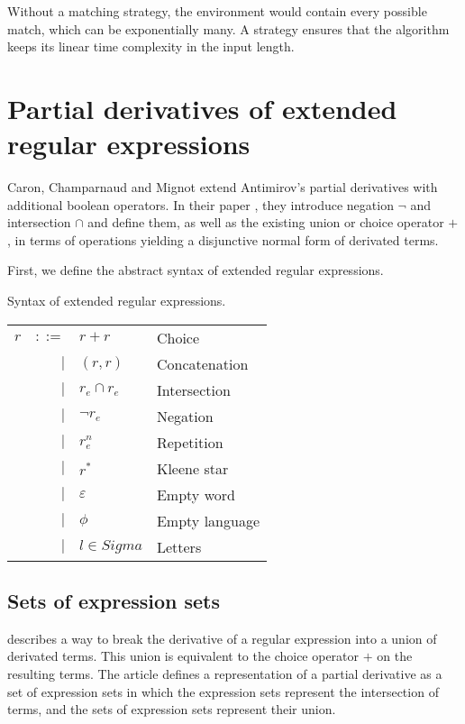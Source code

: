 Without a matching strategy, the environment would contain every possible match,
which can be exponentially many. A strategy ensures that the algorithm keeps its
linear time complexity in the input length.


\section{Partial derivatives of extended regular expressions}

Caron, Champarnaud and Mignot extend Antimirov's partial derivatives with
additional boolean operators. In their paper \cite{pdere}, they introduce
negation $\neg$ and intersection $\cap$ and define them, as well as the existing
union or choice operator $+$, in terms of operations yielding a disjunctive
normal form of derivated terms.

First, we define the abstract syntax of extended regular expressions.

\begin{defn}
   \label{defn-ere-syn}
   Syntax of extended regular expressions.

   \begin{tabular}{lrll}
      $r$	& $::=$	& $r+r$				& Choice		\\
		& $|$	& $(r,r)$			& Concatenation		\\
		& $|$	& $r_e \cap r_e$		& Intersection		\\
        	& $|$	& $\neg r_e$			& Negation		\\
        	& $|$	& $r_e^n$			& Repetition		\\
		& $|$	& $r^*$				& Kleene star		\\
		& $|$	& $\varepsilon$			& Empty word		\\
		& $|$	& $\phi$			& Empty language	\\
		& $|$	& $l \in Sigma$			& Letters		\\
   \end{tabular}
\end{defn}


\subsection{Sets of expression sets}

\cite{pdere} describes a way to break the derivative of a regular expression
into a union of derivated terms. This union is equivalent to the choice operator
$+$ on the resulting terms. The article defines a representation of a partial
derivative as a set of expression sets in which the expression sets represent
the intersection of terms, and the sets of expression sets represent their
union.

